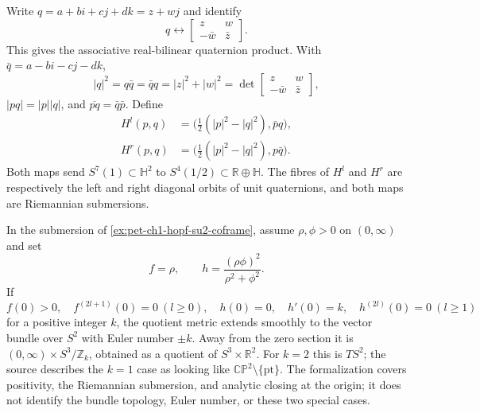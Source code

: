 \begin{remark}
  \label{rem:pet-ch1-ex-22}
  \leanok
  Write $q=a+bi+cj+dk=z+wj$ and identify
  \[
    q\longleftrightarrow
      \left[\begin{smallmatrix}z&w\\-\bar w&\bar z\end{smallmatrix}\right].
  \]
  This gives the associative real-bilinear quaternion product. With
  $\bar q=a-bi-cj-dk$,
  \[
    |q|^2=q\bar q=\bar qq=|z|^2+|w|^2
      =\det\left[\begin{smallmatrix}z&w\\-\bar w&\bar z\end{smallmatrix}\right],
  \]
  $|pq|=|p||q|$, and $\overline{pq}=\bar q\bar p$. Define
  \[
  \begin{aligned}
    H^l(p,q)&=\big(\tfrac12(|p|^2-|q|^2),\bar p q\big),\\
    H^r(p,q)&=\big(\tfrac12(|p|^2-|q|^2),p\bar q\big).
  \end{aligned}
  \]
  Both maps send $S^7(1)\subset\mathbb{H}^2$ to
  $S^4(1/2)\subset\mathbb{R}\oplus\mathbb{H}$. The fibres of $H^l$ and
  $H^r$ are respectively the left and right diagonal orbits of unit
  quaternions, and both maps are Riemannian submersions.
\end{remark}

\begin{remark}
  \label{rem:pet-ch1-ex-23}
  \leanok
  In the submersion of \cref{ex:pet-ch1-hopf-su2-coframe}, assume
  $\rho,\phi>0$ on $(0,\infty)$ and set
  \[
    f=\rho,
    \qquad
    h=\frac{(\rho\phi)^2}{\rho^2+\phi^2}.
  \]
  If
  \[
    f(0)>0,
    \quad f^{(2l+1)}(0)=0\ (l\ge0),
    \quad h(0)=0,
    \quad h'(0)=k,
    \quad h^{(2l)}(0)=0\ (l\ge1)
  \]
  for a positive integer $k$, the quotient metric extends smoothly to the
  vector bundle over $S^2$ with Euler number $\pm k$. Away from the zero
  section it is $(0,\infty)\times S^3/\mathbb{Z}_k$, obtained as a quotient of
  $S^3\times\mathbb{R}^2$. For $k=2$ this is $TS^2$; the source describes the
  $k=1$ case as looking like $\mathbb{CP}^2\setminus\{\mathrm{pt}\}$.
  The formalization covers positivity,
  the Riemannian submersion, and analytic closing at the origin; it does not
  identify the bundle topology, Euler number, or these two special cases.
\end{remark}

